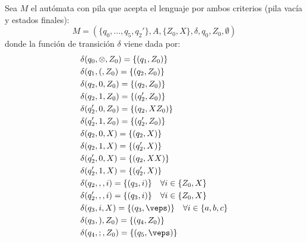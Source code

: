 \begin{ejercicio}
\begin{enumerate}
        Sea $M$ el autómata con pila que acepta el lenguaje por ambos criterios (pila vacía y estados finales):
        \begin{equation*}
            M=(\{q_0,\dots,q_5,q_2'\},A,\{Z_0,X\},\delta,q_0,Z_0,\emptyset)
        \end{equation*}
        donde la función de transición $\delta$ viene dada por:
        \begin{align*}
            &\delta(q_0,\otimes,Z_0) = \{(q_1,Z_0)\}\\
            &\delta(q_1,(,Z_0) = \{(q_2,Z_0)\}\\
            &\delta(q_2,0,Z_0) = \{(q_2,Z_0)\}\\
            &\delta(q_2,1,Z_0) = \{(q_2',Z_0)\}\\
            &\delta(q_2',0,Z_0) = \{(q_2,XZ_0)\}\\
            &\delta(q_2',1,Z_0) = \{(q_2',Z_0)\}\\
            &\delta(q_2,0,X) = \{(q_2,X)\}\\
            &\delta(q_2,1,X) = \{(q_2',X)\}\\
            &\delta(q_2',0,X) = \{(q_2,XX)\}\\
            &\delta(q_2',1,X) = \{(q_2',X)\}\\
            &\delta(q_2,,,i) = \{(q_3,i)\} \quad \forall i\in \{Z_0,X\}\\
            &\delta(q_2',,,i) = \{(q_3,i)\} \quad \forall i\in \{Z_0,X\}\\
            &\delta(q_3,i,X) = \{(q_3,\veps)\} \quad \forall i\in \{a,b,c\}\\
            &\delta(q_3,),Z_0) = \{(q_4,Z_0)\}\\
            &\delta(q_4,;,Z_0) = \{(q_5,\veps)\}
        \end{align*}
    \end{enumerate}
\end{ejercicio}

